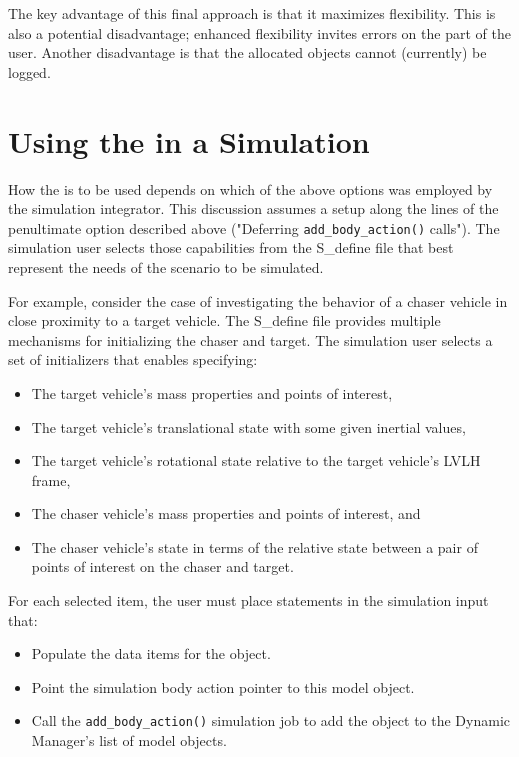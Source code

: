 The key advantage of this final approach is that it maximizes flexibility.
This is also a potential disadvantage; enhanced flexibility invites errors
on the part of the user. Another disadvantage is that the allocated
objects cannot (currently) be logged.

\section*{Using the \ModelDesc in a Simulation}
How the \ModelDesc is to be used depends on which of the above options
was employed by the simulation integrator. This discussion assumes a
setup along the lines of the penultimate option described above
("Deferring {\tt add\_body\_action()} calls").
The simulation user selects those capabilities from
the S\_define file that best represent the needs of the scenario
to be simulated.

For example, consider the case of investigating the behavior of a chaser
vehicle in close proximity to a target vehicle. The S\_define file
provides multiple mechanisms for initializing the chaser and target.
The simulation user selects a set of initializers that enables specifying:
\begin{itemize}
\item The target vehicle's mass properties and points of interest,
\item The target vehicle's translational state with some given inertial values,
\item The target vehicle's rotational state relative to the target
vehicle's LVLH frame,
\item The chaser vehicle's mass properties and points of interest, and
\item The chaser vehicle's state in terms of the relative state between
a pair of points of interest on the chaser and target.
\end{itemize}

For each selected item, the user must place statements in the
simulation input that:
\begin{itemize}
\item Populate the data items for the object. \\
\item Point the simulation body action pointer to this model object. \\
\item Call the {\tt add\_body\_action()} simulation job to add the
object to the Dynamic Manager's list of model objects.
\end{itemize}


